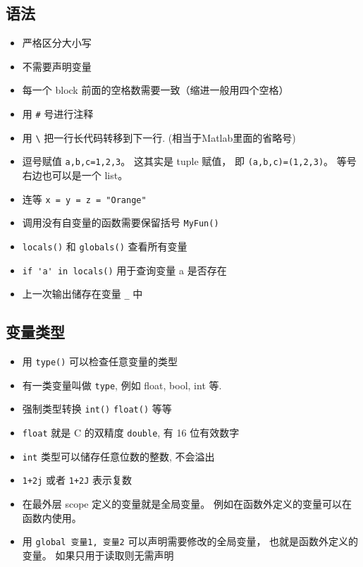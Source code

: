 
\begin{issues}
\issueDraft
\end{issues}


\subsection{语法}
\begin{itemize}
\item 严格区分大小写
\item 不需要声明变量
\item 每一个 block 前面的空格数需要一致（缩进一般用四个空格）
\item 用 \verb`#` 号进行注释
\item 用 \verb`\` 把一行长代码转移到下一行. (相当于Matlab里面的省略号)
\item 逗号赋值 \verb`a,b,c=1,2,3`。 这其实是 tuple 赋值， 即 \verb`(a,b,c)=(1,2,3)`。 等号右边也可以是一个 list。
\item 连等 \verb`x = y = z = "Orange"`
\item 调用没有自变量的函数需要保留括号  \verb`MyFun()`
\item \verb`locals()` 和 \verb`globals()` 查看所有变量
\item \verb`if 'a' in locals()` 用于查询变量 a 是否存在
\item 上一次输出储存在变量 \verb`_` 中
\end{itemize}

\subsection{变量类型}
\begin{itemize}
\item 用 \verb`type()` 可以检查任意变量的类型
\item 有一类变量叫做 \verb`type`, 例如 float, bool, int 等.
\item 强制类型转换 \verb`int()` \verb`float()` 等等
\item \verb`float` 就是 C 的双精度 \verb`double`, 有 16 位有效数字
\item \verb`int` 类型可以储存任意位数的整数, 不会溢出
\item \verb`1+2j` 或者 \verb`1+2J` 表示复数
\item 在最外层 scope 定义的变量就是全局变量。 例如在函数外定义的变量可以在函数内使用。
\item 用 \verb`global 变量1, 变量2` 可以声明需要修改的全局变量， 也就是函数外定义的变量。 如果只用于读取则无需声明
\end{itemize}

